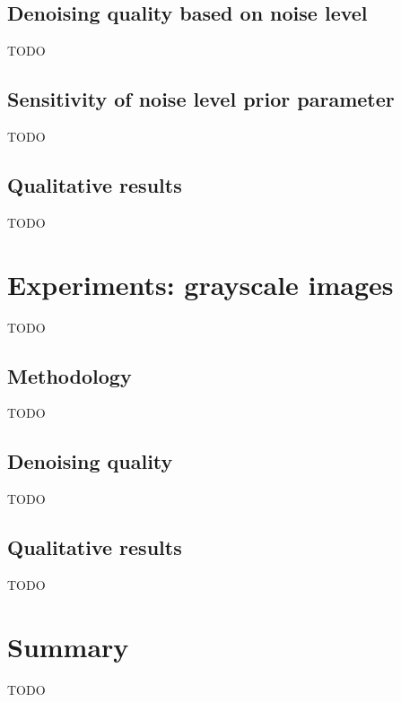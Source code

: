 \documentclass[a4paper, 11pt, onecolumn, openany, titlepage]{report}
\newcommand\numberedchapter[1]{\setlength\topskip{3cm}\chapter{#1}\setlength\topskip{0cm}}
\begin{document}
\section{Denoising quality based on noise level}

TODO

\section{Sensitivity of noise level prior parameter}

TODO

\section{Qualitative results}

TODO

\numberedchapter{Experiments: grayscale images}

TODO

\section{Methodology}

TODO

\section{Denoising quality}

TODO

\section{Qualitative results}

TODO

\numberedchapter{Summary}

TODO
\end{document}
